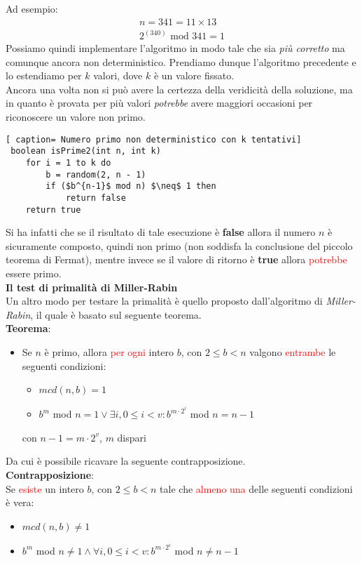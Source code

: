 \documentclass[../cheatSheetAlgoritmi.tex]{subfiles}
\begin{document}
Ad esempio:
\begin{align*} 
	 n = 341 = 11 \times 13 \\
    2^(340) \text{ mod } 341 = 1
\end{align*}
Possiamo quindi implementare l'algoritmo in modo tale che sia \emph{più corretto} ma comunque ancora non deterministico. Prendiamo dunque l'algoritmo precedente e lo estendiamo per $k$ valori, dove $k$ è un valore fissato. \\
Ancora una volta non si può avere la certezza della veridicità della soluzione, ma in quanto è provata per più valori \emph{potrebbe} avere maggiori occasioni per riconoscere un valore non primo.
 \begin{lstlisting}[ caption= Numero primo non deterministico con k tentativi]
 boolean isPrime2(int n, int k)
 	for i = 1 to k do
 		b = random(2, n - 1)
 		if ($b^{n-1}$ mod n) $\neq$ 1 then
 			return false
 	return true
\end{lstlisting}
Si ha infatti che se il risultato di tale esecuzione è \textbf{false} allora il numero $n$ è sicuramente composto, quindi non primo (non soddisfa la conclusione del piccolo teorema di Fermat), mentre invece se il valore di ritorno è \textbf{true} allora \textcolor{red}{potrebbe} essere primo. \\
\textbf{Il test di primalità di Miller-Rabin} \\
Un altro modo per testare la primalità è quello proposto dall'algoritmo di \emph{Miller-Rabin}, il quale è basato sul seguente teorema. \\
\textbf{Teorema}:
\begin{itemize}
	\item Se $n$ è primo, allora \textcolor{red}{per ogni} intero $b$, con $2 \leq b < n$ valgono \textcolor{red}{entrambe} le seguenti condizioni:
	\begin{itemize}
		\item $mcd(n, b) = 1$
		\item $b^m$ mod $n= 1 \lor \exists i, 0 \leq i < v : b^{m \cdot 2^i}$ mod $n = n - 1$
	\end{itemize}
	con $n - 1 = m \cdot 2^{v}$, $m$ dispari
\end{itemize}
Da cui è possibile ricavare la seguente contrapposizione. \\
\textbf{Contrapposizione}: \\
Se \textcolor{red}{esiste} un intero $b$, con $2 \leq b < n$ tale che \textcolor{red}{almeno una} delle seguenti condizioni è vera:
\begin{itemize}
	\item $mcd(n,b) \neq 1$
	\item $b^{m}$ mod  $n \neq 1 \land \forall i, 0 \leq i < v : b^{m \cdot 2^i}$ mod $n \neq n - 1$  
\end{itemize}
\end{document}
